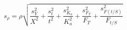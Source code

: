

\[
s_{\rho} = \rho \sqrt{\frac{s_{Y}^{2}}{X^{2}} + \frac{s_{t}^{2}}{t^{2}} + \frac{s_{K_a}^{2}}{K_{a}^{2}} + \frac{s_{F_T}^{2}}{F_{T}} + \frac{s_{F(t/S)}^{2}}{F_{t/S}}}
\]


